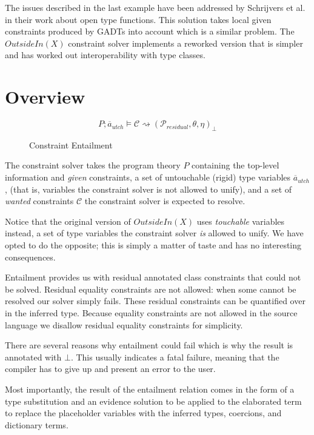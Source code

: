 The issues described in the last example have been addressed by Schrijvers et
al.~\cite{type-checking-with-open-type-functions} in their work about open type
functions. This solution takes local given constraints produced by GADTs into
account which is a similar problem. The $OutsideIn(X)$ constraint solver
implements a reworked version that is simpler and has worked out
interoperability with type classes.

\section{Overview}

\begin{figure}
\[ %
P ; \overline{a}_{utch} \vDash \mathcal{C} \rightsquigarrow
(\mathcal{P}_{residual}, \theta, \eta)_\bot
\]
\caption{Constraint Entailment}
\end{figure}

The constraint solver takes the program theory $P$ containing the top-level
information and \textit{given} constraints, a set of untouchable (rigid) type variables
$\overline{a}_{utch}$, (that is, variables the constraint solver is not allowed
to unify), and a set of \textit{wanted} constraints $\mathcal{C}$ the constraint solver is expected to resolve.

Notice that the original version of $OutsideIn(X)$ uses \textit{touchable} variables instead, a set of
type variables the constraint solver \textit{is} allowed to unify. We have opted to do
the opposite; this is simply a matter of taste and has no interesting
consequences.

Entailment provides us with residual annotated class constraints that could not
be solved. Residual equality constraints are not allowed: when some cannot be
resolved our solver simply fails. These residual constraints can be quantified over
in the inferred type. Because equality constraints are not allowed in the
source language we disallow residual equality constraints for simplicity.

There are several reasons why entailment could fail which is why the result is
annotated with $\bot$. This usually indicates a fatal failure, meaning that the
compiler has to give up and present an error to the user.

Most importantly, the result of the entailment relation comes in the form of a
type substitution and an evidence solution to be applied to the elaborated
\systemfc term to replace the placeholder variables with the inferred types,
coercions, and dictionary terms.

